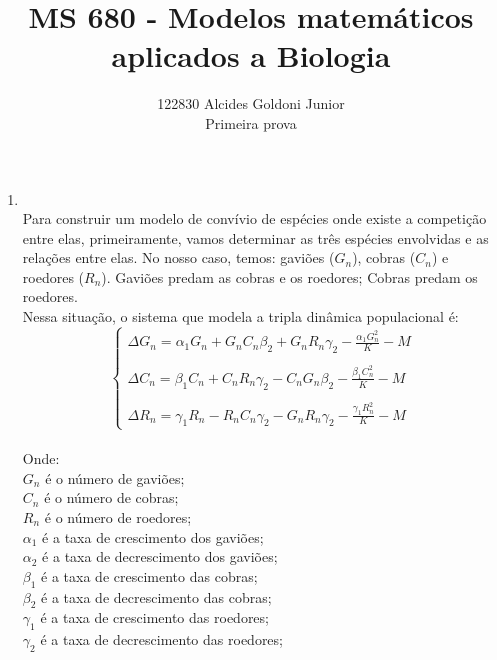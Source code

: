 \documentclass[a4paper]{article}
\title{MS 680 - Modelos matem\'{a}ticos aplicados a Biologia}
\author{122830 Alcides Goldoni Junior\\
  \Small Primeira prova \\
}%
\begin{document}
\maketitle
\begin{enumerate}

\item
\\
Para construir um modelo de conv\'ivio de esp\'ecies onde existe a competi\c{c}\~ao entre elas, primeiramente, vamos determinar as tr\^es esp\'ecies envolvidas e as rela\c{c}\~oes entre elas. No nosso caso, temos: gavi\~oes ($G_n$), cobras ($C_n$) e roedores ($R_n$). Gavi\~oes predam as cobras e os roedores; Cobras predam os roedores.\\
Nessa situa\c{c}\~ao, o sistema que modela a tripla din\^amica populacional \'e:
\begin{equation}
\left\{\begin{array}{l}
\Delta G_n = \alpha_1 G_n + G_n C_n\beta_2 + G_n R_n\gamma_2 - \frac{\alpha_1 G_n ^2}{K}  - M\\
\\
\Delta C_n = \beta_1 C_n + C_n R_n\gamma_2 - C_n G_n\beta_2 - \frac{\beta_1 C_n ^2}{K} - M \\
\\
\Delta R_n = \gamma_1 R_n - R_n C_n\gamma_2 - G_n R_n\gamma_2 - \frac{\gamma_1 R_n ^2}{K} -M 
\end{array}
\end{equation}
\\
Onde:\\
$G_n$ \'e o n\'umero de gavi\~oes;\\
$C_n$ \'e o n\'umero de cobras;\\
$R_n$ \'e o n\'umero de roedores;\\
$\alpha_1$ \'e a taxa de crescimento dos gavi\~oes;\\
$\alpha_2$ \'e a taxa de decrescimento dos gavi\~oes;\\
$\beta_1$ \'e a taxa de crescimento das cobras;\\
$\beta_2$ \'e a taxa de decrescimento das cobras;\\
$\gamma_1$ \'e a taxa de crescimento das roedores;\\
$\gamma_2$ \'e a taxa de decrescimento das roedores;\\

\end{enumerate}
\end{document}

